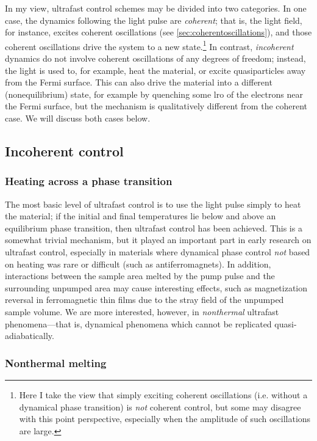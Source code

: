 In my view, ultrafast control schemes may be divided into two categories.
In one case, the dynamics following the light pulse are \emph{coherent}; that is, the light field, for instance, excites coherent oscillations (see \cref{sec:coherentoscillations}), and those coherent oscillations drive the system to a new state.\footnote{Here I take the view that simply exciting coherent oscillations (i.e. without a dynamical phase transition) is \emph{not} coherent control, but some may disagree with this point perspective, especially when the amplitude of such oscillations are large.}
In contrast, \emph{incoherent} dynamics do not involve coherent oscillations of any degrees of freedom; instead, the light is used to, for example, heat the material, or excite quasiparticles away from the Fermi surface.
This can also drive the material into a different (nonequilibrium) state, for example by quenching some \gls{lro} of the electrons near the Fermi surface, but the mechanism is qualitatively different from the coherent case.
We will discuss both cases below.

\subsection{Incoherent control}

\subsubsection{Heating across a phase transition}

The most basic level of ultrafast control is to use the light pulse simply to heat the material; if the initial and final temperatures lie below and above an equilibrium phase transition, then ultrafast control has been achieved.
This is a somewhat trivial mechanism, but it played an important part in early research on ultrafast control, especially in materials where dynamical phase control \emph{not} based on heating was rare or difficult (such as antiferromagnets\citep{kimel_laser-induced_2004}).
In addition, interactions between the sample area melted by the pump pulse and the surrounding unpumped area may cause interesting effects, such as magnetization reversal in ferromagnetic thin films due to the stray field of the unpumped sample volume\citep{ogasawara_submicron-scale_2009}.
We are more interested, however, in \emph{nonthermal} ultrafast phenomena---that is, dynamical phenomena which cannot be replicated quasi-adiabatically.

\subsubsection{Nonthermal melting}\label{sec:nonthermalmelting}

